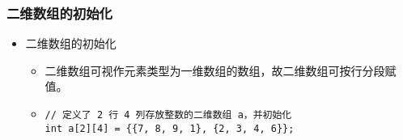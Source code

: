 \begin{frame}[fragile]
    \frametitle{二维数组的初始化}

    \begin{itemize}
        \item 二维数组的初始化
            \begin{itemize}[<+->]
                \item 二维数组可视作元素类型为一维数组的数组，故二维数组可按行分段赋值。
                \item
                    \lstinline|// 定义了 2 行 4 列存放整数的二维数组 a，并初始化|\\
                    \lstinline|int a[2][4] = {{7, 8, 9, 1}, {2, 3, 4, 6}};|
            \end{itemize}
    \end{itemize}

    \begin{columns}



\end{columns}
\end{frame}
